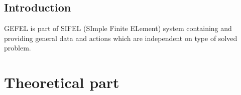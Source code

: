 \documentclass[12pt]{book}
\begin{document}
\tableofcontents

\chapter{Introduction}
GEFEL is part of SIFEL (SImple Finite ELement) system containing and providing
general data and actions which are independent on type of solved problem.


\part{Theoretical part}












%
%
\printindex
\end{document}
